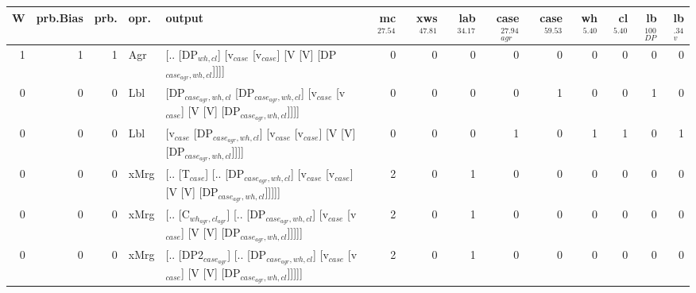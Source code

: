 \begin{tabularx}{\linewidth}{rrrlXrrrrrrrrr}
\hline
   W &   prb.Bias &   prb. & opr.   & output                                                                                                                    &   mc$^{27.54}$ &   xws$^{47.81}$ &   lab$^{34.17}$ &   case$_{agr}^{27.94}$ &   case$^{59.53}$ &   wh$^{5.40}$ &   cl$^{5.40}$ &   lb$_{DP}^{100}$ &   lb$_{v}^{.34}$ \\
\hline
   1 &       1 &   1 & Agr  & [.. [DP$_{wh,cl}$] [v$_{case}$ [v$_{case}$] [V [V] [DP$_{case_{agr},wh,cl}$]]]]                                                             &            0 &             0 &             0 &                  0 &              0 &           0 &           0 &                0 &             0 \\
   0 &       0 &   0 & Lbl  & [DP$_{case_{agr},wh,cl}$ [DP$_{case_{agr},wh,cl}$] [v$_{case}$ [v$_{case}$] [V [V] [DP$_{case_{agr},wh,cl}$]]]]                                     &            0 &             0 &             0 &                  0 &              1 &           0 &           0 &                1 &             0 \\
   0 &       0 &   0 & Lbl  & [v$_{case}$ [DP$_{case_{agr},wh,cl}$] [v$_{case}$ [v$_{case}$] [V [V] [DP$_{case_{agr},wh,cl}$]]]]                                                &            0 &             0 &             0 &                  1 &              0 &           1 &           1 &                0 &             1 \\
   0 &       0 &   0 & xMrg & [.. [T$_{case}$] [.. [DP$_{case_{agr},wh,cl}$] [v$_{case}$ [v$_{case}$] [V [V] [DP$_{case_{agr},wh,cl}$]]]]]                                      &            2 &             0 &             1 &                  0 &              0 &           0 &           0 &                0 &             0 \\
   0 &       0 &   0 & xMrg & [.. [C$_{wh_{agr},cl_{agr}}$] [.. [DP$_{case_{agr},wh,cl}$] [v$_{case}$ [v$_{case}$] [V [V] [DP$_{case_{agr},wh,cl}$]]]]]                             &            2 &             0 &             1 &                  0 &              0 &           0 &           0 &                0 &             0 \\
   0 &       0 &   0 & xMrg & [.. [DP2$_{case_{agr}}$] [.. [DP$_{case_{agr},wh,cl}$] [v$_{case}$ [v$_{case}$] [V [V] [DP$_{case_{agr},wh,cl}$]]]]]                                &            2 &             0 &             1 &                  0 &              0 &           0 &           0 &                0 &             0 \\

\end{tabularx}

